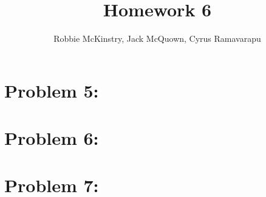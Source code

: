 \documentclass[12pt]{article}
\begin{document}
\title{Homework 6}
\author{Robbie McKinstry, Jack McQuown, Cyrus Ramavarapu}
\renewcommand{\today}{13 September 2016}
\renewcommand{\baselinestretch}{1.5}

\maketitle

\section*{Problem 5: }
\section*{Problem 6: }
\section*{Problem 7: }
\end{document}
